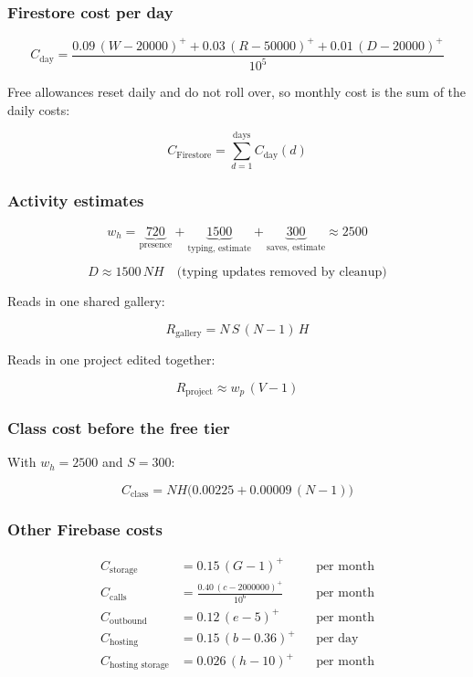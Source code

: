 \documentclass{article}
\newcommand{\pos}[1]{\left(#1\right)^{+}}
\begin{document}
\subsubsection{Firestore cost per day}

\[
C_{\text{day}} =
\frac{0.09\,\pos{W - 20000}
    + 0.03\,\pos{R - 50000}
    + 0.01\,\pos{D - 20000}}{10^{5}}
\]

Free allowances reset daily and do not roll over, so monthly cost is the sum
of the daily costs:

\[
C_{\text{Firestore}} = \sum_{d=1}^{\text{days}} C_{\text{day}}(d)
\]

\subsubsection{Activity estimates}

\[
w_h = \underbrace{720}_{\text{presence}}
    + \underbrace{1500}_{\text{typing, estimate}}
    + \underbrace{300}_{\text{saves, estimate}}
    \approx 2500
\]

\[
D \approx 1500\,N H \quad \text{(typing updates removed by cleanup)}
\]

Reads in one shared gallery:

\[
R_{\text{gallery}} = N\,S\,(N - 1)\,H
\]

Reads in one project edited together:

\[
R_{\text{project}} \approx w_p\,(V - 1)
\]

\subsubsection{Class cost before the free tier}

With $w_h = 2500$ and $S = 300$:

\[
C_{\text{class}} = N H \bigl(0.00225 + 0.00009\,(N - 1)\bigr)
\]

\subsubsection{Other Firebase costs}

\begin{align*}
C_{\text{storage}} &= 0.15\,\pos{G - 1} && \text{per month} \\
C_{\text{calls}} &= \frac{0.40\,\pos{c - 2000000}}{10^{6}} && \text{per month} \\
C_{\text{outbound}} &= 0.12\,\pos{e - 5} && \text{per month} \\
C_{\text{hosting}} &= 0.15\,\pos{b - 0.36} && \text{per day} \\
C_{\text{hosting storage}} &= 0.026\,\pos{h - 10} && \text{per month}
\end{align*}
\end{document}
